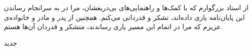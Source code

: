 


\begin{center}
\end{center}

از استاد بزرگوارم که با کمک‌ها و راهنمایی‌های بی‌دریغشان، مرا
در به سرانجام رساندن این پایان‌نامه یاری داده‌اند، تشکر و قدردانی می‌کنم. همچنین از پدر و مادر و خانواده‌ی عزیزم که مرا در اتمام این مسیر یاری رساندند، متشکر و قدردان آن‌ها هستم.

‌جدید

